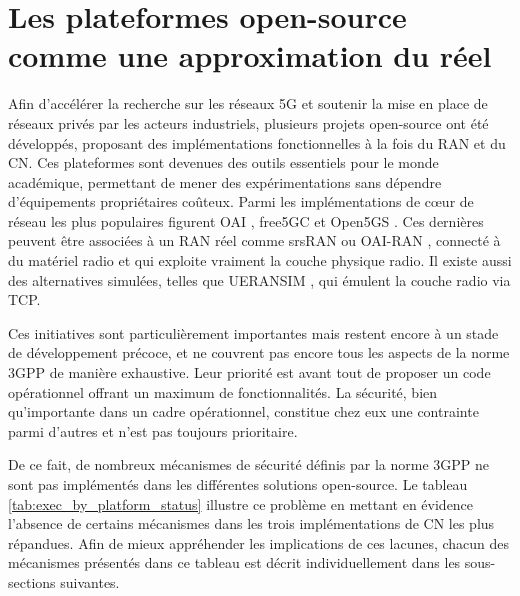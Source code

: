 \documentclass[a4paper,11pt,twoside]{StyleThese}
\begin{document}
\section{Les plateformes open-source comme une approximation du réel}
Afin d’accélérer la recherche sur les réseaux 5G et soutenir la mise en place de réseaux privés par les acteurs industriels, plusieurs projets open-source ont été développés, proposant des implémentations fonctionnelles à la fois du RAN et du CN. Ces plateformes sont devenues des outils essentiels pour le monde académique, permettant de mener des expérimentations sans dépendre d’équipements propriétaires coûteux. Parmi les implémentations de cœur de réseau les plus populaires figurent OAI \cite{oai}, free5GC \cite{free5GC} et Open5GS \cite{open5gs}. Ces dernières peuvent être associées à un RAN réel comme srsRAN \cite{srsRAN} ou OAI-RAN \cite{oai}, connecté à du matériel radio et qui exploite vraiment la couche physique radio. Il existe aussi des alternatives simulées, telles que UERANSIM \cite{ueransim}, qui émulent la couche radio via TCP.

Ces initiatives sont particulièrement importantes mais restent encore à un stade de développement précoce, et ne couvrent pas encore tous les aspects de la norme 3GPP de manière exhaustive. Leur priorité est avant tout de proposer un code opérationnel offrant un maximum de fonctionnalités. La sécurité, bien qu’importante dans un cadre opérationnel, constitue chez eux une contrainte parmi d’autres et n’est pas toujours prioritaire. 

De ce fait, de nombreux mécanismes de sécurité définis par la norme 3GPP ne sont pas implémentés dans les différentes solutions open-source. Le tableau \ref{tab:exec_by_platform_status} illustre ce problème en mettant en évidence l’absence de certains mécanismes dans les trois implémentations de CN les plus répandues. Afin de mieux appréhender les implications de ces lacunes, chacun des mécanismes présentés dans ce tableau est décrit individuellement dans les sous-sections suivantes. %
\end{document}
